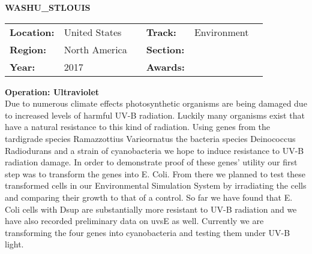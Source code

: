 \textbf{\uppercase{WashU\_StLouis}} \FloatBarrier \begin{table}[h] \begin{tabular}{lp{2.5cm}llll} \textbf{Location:} & United States & \multicolumn{1}{|l}{} & \textbf{Track:}   & Environment \\ \textbf{Region:}   & North America   & \multicolumn{1}{|l}{} & \textbf{Section:} &  \\ \textbf{Year:}     & 2017   & \multicolumn{1}{|l}{} & \textbf{Awards:}  & \end{tabular} \end{table} \FloatBarrier \noindent\textbf{Operation: Ultraviolet} \vspace{.2cm}\\ 
Due to numerous climate effects photosynthetic organisms are being damaged due to increased levels of harmful UV-B radiation. Luckily many organisms exist that have a natural resistance to this kind of radiation. Using genes from the tardigrade species Ramazzottius Varieornatus the bacteria species Deinococcus Radiodurans and a strain of cyanobacteria we hope to induce resistance to UV-B radiation damage. In order to demonstrate proof of these genes’ utility our first step was to transform the genes into E. Coli. From there we planned to test these transformed cells in our Environmental Simulation System by irradiating the cells and comparing their growth to that of a control. So far we have found that E. Coli cells with Dsup are substantially more resistant to UV-B radiation and we have also recorded preliminary data on uvsE as well. Currently we are transforming the four genes into cyanobacteria and testing them under UV-B light.
\vspace{2cm}

